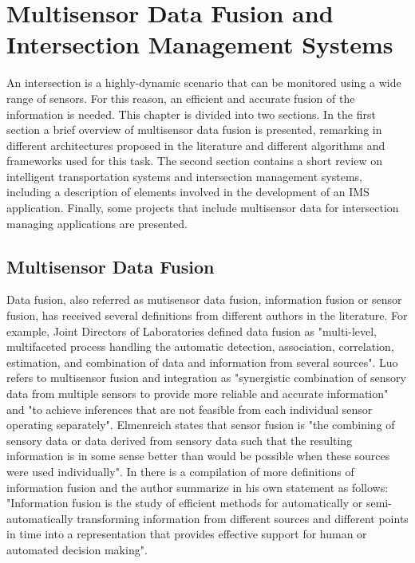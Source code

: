 %

\chapter [Sensor Fusion and IMS]{Multisensor Data Fusion and Intersection Management Systems}

An intersection is a highly-dynamic scenario that can be monitored using a wide range of sensors. For this reason, an efficient and accurate fusion of the information is needed. This chapter is divided into two sections. In the first section a brief overview of multisensor data fusion is presented, remarking in different architectures proposed in the literature and different algorithms and frameworks used for this task. The second section contains a short review on intelligent transportation systems and intersection management systems, including a description of elements involved in the development of an IMS application. Finally, some projects that include multisensor data for intersection managing applications are presented.

\section{Multisensor Data Fusion}

Data fusion, also referred as mutisensor data fusion, information fusion or sensor fusion, has received several definitions from different authors in the literature. For example, Joint Directors of Laboratories defined data fusion as "multi-level, multifaceted process handling the automatic detection, association, correlation, estimation, and combination of data and information from several sources"\cite{White1991}. Luo refers to multisensor fusion and integration as "synergistic combination of sensory data from multiple sensors to provide more reliable and accurate information"\cite{Luo2002} and "to achieve inferences that are not feasible from each individual sensor operating separately"\cite{Luo2011}. Elmenreich states that sensor fusion is "the combining of sensory data or data derived from sensory data such that the resulting information is in some sense better than would be possible when these sources were used individually"\cite{Elmenreich2007}. In \cite{Bostrom2007} there is a compilation of more definitions of information fusion and the author summarize in his own statement as follows: "Information fusion is the study of efficient methods for automatically or semi-automatically transforming information from different sources and different points in time into a representation that provides effective support for human or automated decision making".  

